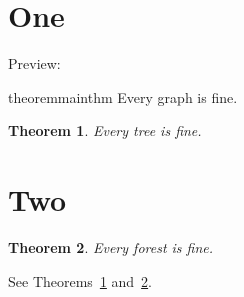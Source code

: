 \documentclass{article}
\makeatletter
\newtheorem{@theorem}{Theorem}[section]
\newenvironment{theorem}{\begin{@theorem}}{\end{@theorem}}
\makeatother
\begin{document}
\section{One}
Preview:
\begin{restatable*}{theorem}{mainthm}
Every graph is fine.
\end{restatable*}
\begin{theorem}\label{thm:next}
Every tree is fine.
\end{theorem}
\section{Two}
\mainthm
\begin{theorem}\label{thm:after}
Every forest is fine.
\end{theorem}
See Theorems~\ref{thm:next} and~\ref{thm:after}.
\end{document}
